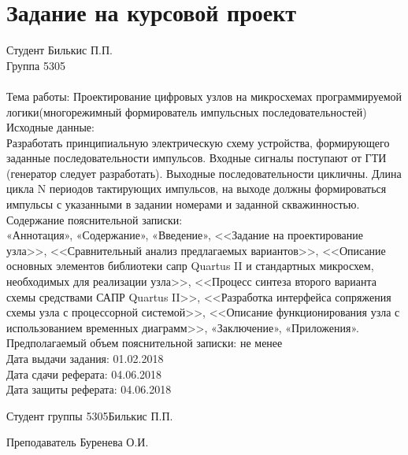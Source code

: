 \documentclass[a4paper,14pt,russian]{article}
\newcommand{\theme}{Проектирование цифровых узлов на микросхемах программируемой логики}
\newcommand{\groupnumber}{5305}
\newcommand{\studentname}{Билькис П.П.}
\newcommand{\teachername}{Буренева О.И.}
\begin{document}


\section*{Задание на курсовой проект}
Студент \studentname\\
Группа \groupnumber\\\\
Тема работы: \theme (многорежимный формирователь импульсных последовательностей) \\
Исходные данные:\\
Разработать принципиальную электрическую схему устройства, формирующего заданные последовательности импульсов. Входные сигналы поступают от ГТИ (генератор следует разработать). Выходные последовательности цикличны. Длина цикла N периодов тактирующих импульсов, на выходе должны формироваться импульсы с указанными в задании номерами и заданной скважинностью.
Содержание пояснительной записки:\\
«Аннотация», «Содержание», «Введение», <<Задание на проектирование узла>>, <<Сравнительный анализ предлагаемых вариантов>>,
<<Описание основных элементов библиотеки сапр Quartus II и стандартных микросхем, необходимых для реализации узла>>, <<Процесс синтеза второго варианта схемы средствами САПР Quartus II>>, <<Разработка интерфейса сопряжения схемы узла с процессорной системой>>, <<Описание функционирования узла с использованием временных диаграмм>>, «Заключение», «Приложения».
Предполагаемый объем пояснительной записки:
не менее \pageref{LastPage} \\
Дата выдачи задания: 01.02.2018\\
Дата сдачи реферата: 04.06.2018\\
Дата защиты реферата: 04.06.2018\\

\vfill


Студент группы \groupnumber \hfill \studentname


Преподаватель \hfill \teachername


\clearpage

\begin{abstract}
  В данном курсовом проекте описывается процесс разработки многорежимного формирователя импульсных последовательностей. Рассматривается структурный и функциональный синтез, описывается устройство управления, демонстрируется реализация узла в САПР Quartus II. Приводятс результаты моделирования.
\end{abstract}
\end{document}
